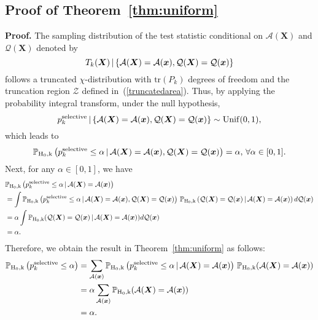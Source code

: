 \subsection{Proof of Theorem~\ref{thm:uniform}}
\label{app:proofs:uniform}
\textbf{Proof.}
The sampling distribution of the test statistic conditional on $\mathcal{A}(\bm{X})$ and $\mathcal{Q}(\bm{X})$ denoted by
\begin{equation}
  T_k(\bm{X}) \, | \, \{\mathcal{A}(\bm{X}) = \mathcal{A}(\bm{x}), \mathcal{Q}(\bm{X}) =\mathcal{Q}(\bm{x})\} \notag
\end{equation}
follows a truncated $\chi$-distribution with $\mathrm{tr}(P_k)$ degrees of freedom and the truncation region $\mathcal{Z}$ defined in~(\ref{truncatedarea}).
Thus, by applying the probability integral transform, under the null hypothesis, 
\begin{equation}
  p_k^{\rm{selective}} \, | \, \{\mathcal{A}(\bm{X}) = \mathcal{A}(\bm{x}), \mathcal{Q}(\bm{X}) =\mathcal{Q}(\bm{x})\} \sim \rm{Unif}(0,1), \notag
\end{equation}
which leads to 
\begin{equation}
  \mathbb{P}_{\rm{H}_0,k} \left(p_k^{\rm{selective}}\leq\alpha \, | \, \mathcal{A}(\bm{X}) = \mathcal{A}(\bm{x}), \mathcal{Q}(\bm{X}) =\mathcal{Q}(\bm{x})\right) = \alpha, \, \forall \alpha \in [0, 1]. \notag
\end{equation}
Next, for any $\alpha \in [0, 1]$, we have
\begin{align}
  &\mathbb{P}_{\rm{H}_0,k} \left(p_k^{\rm{selective}}\leq\alpha \, | \, \mathcal{A}(\bm{X}) = \mathcal{A}(\bm{x})\right) \notag \\
  &= \int \mathbb{P}_{\rm{H}_0,k} \left(p_k^{\rm{selective}}\leq\alpha \, | \, \mathcal{A}(\bm{X}) = \mathcal{A}(\bm{x}), \mathcal{Q}(\bm{X}) =\mathcal{Q}(\bm{x})\right) \,
  \mathbb{P}_{\rm{H}_0,k} \left(\mathcal{Q}(\bm{X}) =\mathcal{Q}(\bm{x}) \, | \, \mathcal{A}(\bm{X}) = \mathcal{A}(\bm{x})\right) d\mathcal{Q}(\bm{x}) \notag \\
  &= \alpha \int \mathbb{P}_{\rm{H}_0,k} (\mathcal{Q}(\bm{X}) =\mathcal{Q}(\bm{x}) \, | \, \mathcal{A}(\bm{X}) = \mathcal{A}(\bm{x})) d\mathcal{Q}(\bm{x}) \notag \\
  &= \alpha. \notag
\end{align}
Therefore, we obtain the result in Theorem~\ref{thm:uniform} as follows:
\begin{align}
  \mathbb{P}_{\rm{H}_0,k} \left(p_k^{\rm{selective}}\leq\alpha\right) 
  &= \sum_{\mathcal{A}(\bm{x})} \mathbb{P}_{\rm{H}_0,k} \left(p_k^{\rm{selective}}\leq\alpha \, | \, \mathcal{A}(\bm{X}) = \mathcal{A}(\bm{x})\right) \, 
  \mathbb{P}_{\rm{H}_0,k} (\mathcal{A}(\bm{X}) = \mathcal{A}(\bm{x})) \notag \\
  &= \alpha \sum_{\mathcal{A}(\bm{x})} \mathbb{P}_{\rm{H}_0,k} (\mathcal{A}(\bm{X}) = \mathcal{A}(\bm{x})) \notag \\
  &= \alpha. \notag
\end{align}
